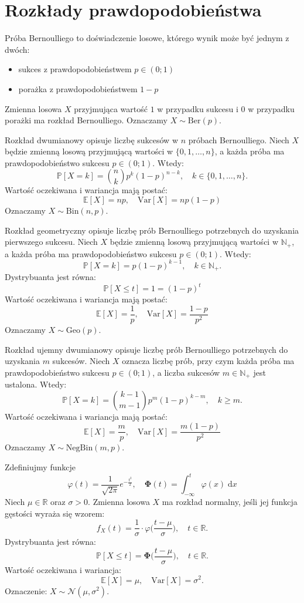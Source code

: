 \section{Rozkłady prawdopodobieństwa}

Próba Bernoulliego to doświadczenie losowe, którego wynik może być jednym z dwóch:
\begin{itemize}
    \item sukces z prawdopodobieństwem  $p \in (0;1)$
    \item porażka z prawdopodobieństwem  $1 - p$
\end{itemize}  
Zmienna losowa $X$ przyjmująca wartość $1$ w przypadku sukcesu i $0$ w przypadku porażki ma rozkład Bernoulliego. Oznaczamy $X \sim \mathrm{Ber}(p)$.
 

Rozkład dwumianowy opisuje liczbę sukcesów w $n$ próbach Bernoulliego. Niech $X$ będzie zmienną losową przyjmującą wartości w $\{0,1,\dots,n\}$, a każda próba ma prawdopodobieństwo sukcesu $p \in (0;1)$.  
Wtedy:
\[
\mathbb{P}[X = k] = \binom{n}{k}p^k(1-p)^{n-k}, \quad k \in \{0,1,\dots,n\}.
\]
Wartość oczekiwana i wariancja mają postać:
\[
    \mathbb{E}[X] = np, \quad \mathrm{Var}[X] = np(1-p)
\]
Oznaczamy $X \sim \mathrm{Bin}(n,p)$.

Rozkład geometryczny opisuje liczbę prób Bernoulliego potrzebnych do uzyskania pierwszego sukcesu.  
Niech $X$ będzie zmienną losową przyjmującą wartości w $\mathbb{N}_+$, a każda próba ma prawdopodobieństwo sukcesu $p \in (0;1)$.  
Wtedy:
\[
    \mathbb{P}[X = k] = p(1 - p)^{k-1}, \quad k \in \mathbb{N}_+.
\]
Dystrybuanta jest równa:
\[
    \mathbb{P}[X\le t] = 1 = (1-p)^t
\]
Wartość oczekiwana i wariancja mają postać:
\[
    \mathbb{E}[X] = \frac{1}{p}, \quad \mathrm{Var}[X] = \frac{1 - p}{p^2}
\]
Oznaczamy $X \sim \mathrm{Geo}(p)$.

Rozkład ujemny dwumianowy opisuje liczbę prób Bernoulliego potrzebnych do uzyskania $m$ sukcesów.  
Niech $X$ oznacza liczbę prób, przy czym każda próba ma prawdopodobieństwo sukcesu $p \in (0;1)$, a liczba sukcesów $m \in \mathbb{N}_+$ jest ustalona.  
Wtedy:
\[
\mathbb{P}[X = k] = \binom{k-1}{m-1} p^m (1 - p)^{k - m}, \quad k \ge m.
\]
Wartość oczekiwana i wariancja mają postać:
\[
    \mathbb{E}[X] = \frac{m}{p}, \quad \mathrm{Var}[X] = \frac{m(1 - p)}{p^2}
\]
Oznaczamy $X \sim \mathrm{NegBin}(m, p)$.

Zdefiniujmy funkcje
\[
    \varphi(t)=\frac{1}{\sqrt{2\pi}}e^{-\frac{t^2}{2}}, \quad \mathbf{\Phi}(t)=\int_{-\infty}^{t} \varphi(x)\;\mathrm{d}x
\]
Niech $\mu \in \mathbb{R}$ oraz $\sigma > 0$. Zmienna losowa $X$ ma rozkład normalny, jeśli jej funkcja gęstości wyraża się wzorem:
\[
f_X(t) = \frac{1}{\sigma}\cdot\varphi\Big(\frac{t-\mu}{\sigma}\Big), \quad t \in \mathbb{R}.
\]
Dystrybuanta jest równa:
\[
\mathbb{P}[X \le t] = \mathbf{\Phi}\Big(\frac{t-\mu}{\sigma}\Big), \quad t \in \mathbb{R}.
\]
Wartość oczekiwana i wariancja:
\[
\mathbb{E}[X] = \mu, \quad \mathrm{Var}[X] = \sigma^2.
\]
Oznaczenie: $X \sim \mathcal{N}(\mu, \sigma^2)$.


